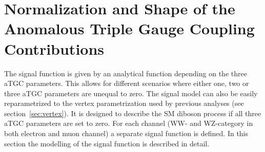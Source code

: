 \section{Normalization and Shape of the Anomalous Triple Gauge Coupling Contributions}
\label{sec:NormalizationandShapeoftheaTGCContributions}

The signal function is given by an analytical function depending on the three aTGC parameters. This allows for different scenarios where either one, two or three aTGC parameters are unequal to zero. The signal model can also be easily reparametrized to the vertex parametrization used by previous analyses (see section~\ref{sec:vertex}). It is designed to describe the SM diboson process if all three aTGC parameters are set to zero. For each channel (WW- and WZ-category in both electron and muon channel) a separate signal function is defined. In this section the modelling of the signal function is described in detail.

